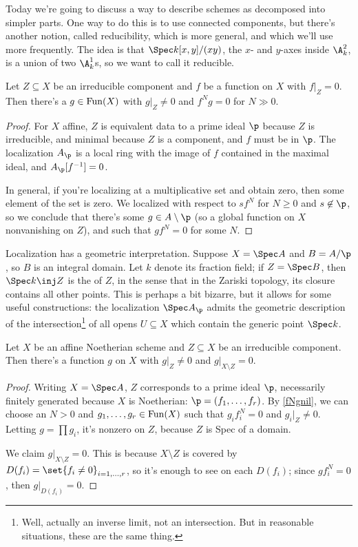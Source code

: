 Today we're going to discuss a way to describe schemes as decomposed into simpler parts. One way to do this is to
use connected components, but there's another notion, called reducibility, which is more general, and which we'll
use more frequently. The idea is that $\Spec k[x,y]/(xy)$, the $x$- and $y$-axes inside $\A_k^2$, is a union of two
$\A_k^1$s, so we want to call it reducible.

\begin{lem}
\label{fNgnil}
Let  $Z\subseteq X$ be an irreducible component and $f$ be a function on $X$ with $f|_Z = 0$. Then there's a
$g\in\mathrm{Fun}(X)$ with $g|_Z \ne 0$ and $f^Ng = 0$ for $N\gg 0$.
\end{lem}
\begin{proof}
For $X$ affine, $Z$ is equivalent data to a prime ideal $\p$ because $Z$ is irreducible, and minimal because $Z$ is
a component, and $f$ must be in $\p$. The localization $A_\p$ is a local ring with the image of $f$ contained in
the maximal ideal, and $A_\p[f^{-1}] = 0$.

In general, if you're localizing at a multiplicative set and obtain zero, then some element of the set is zero. We
localized with respect to $sf^N$ for $N\ge 0$ and $s\not\in\p$, so we conclude that there's some $g\in
A\setminus\p$ (so a global function on $X$ nonvanishing on $Z$), and such that $gf^N = 0$ for some $N$.
\end{proof}
\begin{rem}
Localization has a geometric interpretation. Suppose $X = \Spec A$ and $B = A/\p$, so $B$ is an integral domain.
Let $k$ denote its fraction field; if $Z = \Spec B$, then $\Spec k\inj Z$ is the  of $Z$, in
the sense that in the Zariski topology, its closure contains all other points. This is perhaps a bit bizarre, but
it allows for some useful constructions: the localization $\Spec A_\p$ admits the geometric description of the
intersection\footnote{Well, actually an inverse limit, not an intersection. But in reasonable situations, these are
the same thing.} of all opens $U\subseteq X$ which contain the generic point $\Spec k$.
\end{rem}
\begin{lem}
Let $X$ be an affine Noetherian scheme and $Z\subseteq X$ be an irreducible component. Then there's a function $g$
on $X$ with $g|_Z\ne 0$ and $g|_{X\setminus Z} = 0$.
\end{lem}
\begin{proof}
Writing $X = \Spec A$, $Z$ corresponds to a prime ideal $\p$, necessarily finitely generated because $X$ is
Noetherian: $\p = (f_1,\dotsc,f_r)$. By \cref{fNgnil}, we can choose an $N > 0$ and $g_1,\dotsc,g_r\in\mathrm{Fun}(X)$ such
that $g_if_i^N = 0$ and $g_i|_Z \ne 0$. Letting $g = \prod g_i$, it's nonzero on $Z$, because $Z$ is Spec of a
domain.

We claim $g|_{X\setminus Z} = 0$. This is because $X\setminus Z$ is covered by $D(f_i) = \set{f_i\ne 0}_{i =
1,\dotsc,r}$, so it's enough to see on each $D(f_i)$; since $gf_i^N = 0$, then $g|_{D(f_i)} = 0$.
\end{proof}
